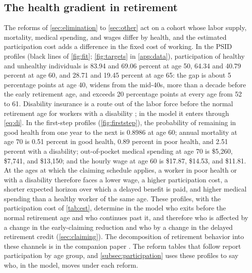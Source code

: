 \subsection{The health gradient in retirement}\label{subsec:gradient}

The reforms of \autoref{sec:elimination} to \autoref{sec:other} act on a cohort whose labor supply, mortality, medical spending, and wages differ by health, and the estimated participation cost adds a difference in the fixed cost of working. In the PSID profiles (black lines of \autoref{fig:fit}; \autoref{fig:targets} in \autoref{app:data}), participation of healthy and unhealthy individuals is 83.94 and 69.06 percent at age 50, 64.34 and 40.79 percent at age 60, and 28.71 and 19.45 percent at age 65: the gap is about 5 percentage points at age 40, widens from the mid-40s, more than a decade before the early retirement age, and exceeds 20 percentage points at every age from 52 to 61. %
Disability insurance is a route out of the labor force before the normal retirement age for workers with a disability \citep{Maestas2013,French2014,Low2015,Li2018}; in the model it enters through \eqref{eq:di}. %
In the first-step profiles (\autoref{fig:firststep}), the probability of remaining in good health from one year to the next is 0.8986 at age 60; annual mortality at age 70 is 0.51 percent in good health, 0.89 percent in poor health, and 2.51 percent with a disability; out-of-pocket medical spending at age 70 is \$5,260, \$7,741, and \$13,150; and the hourly wage at age 60 is \$17.87, \$14.53, and \$11.81. %
At the ages at which the claiming schedule applies, a worker in poor health or with a disability therefore faces a lower wage, a higher participation cost, a shorter expected horizon over which a delayed benefit is paid, and higher medical spending than a healthy worker of the same age. These profiles, with the participation cost of \autoref{tab:est}, determine in the model who exits before the normal retirement age and who continues past it, and therefore who is affected by a change in the early-claiming reduction and who by a change in the delayed retirement credit (\autoref{sec:claiming}). The decomposition of retirement behavior into these channels is in the companion paper \citep{ndiaye2026flexible}. The reform tables that follow report participation by age group, and \autoref{subsec:participation} uses these profiles to say who, in the model, moves under each reform.
